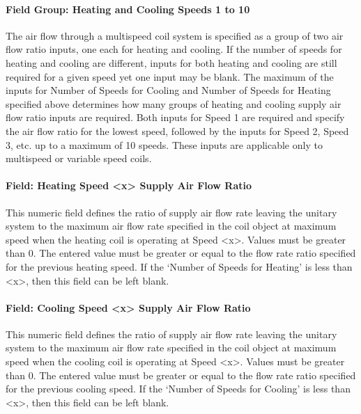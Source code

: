 \paragraph{Field Group: Heating and Cooling Speeds 1 to 10}\label{field-group-heating-and-cooling-speeds-1-to-10}

The air flow through a multispeed coil system is specified as a group of two air flow ratio inputs, one each for heating and cooling. If the number of speeds for heating and cooling are different, inputs for both heating and cooling are still required for a given speed yet one input may be blank. The maximum of the inputs for Number of Speeds for Cooling and Number of Speeds for Heating specified above determines how many groups of heating and cooling supply air flow ratio inputs are required. Both inputs for Speed 1 are required and specify the air flow ratio for the lowest speed, followed by the inputs for Speed 2, Speed 3, etc. up to a maximum of 10 speeds. These inputs are applicable only to multispeed or variable speed coils.

\paragraph{Field: Heating Speed \textless{}x\textgreater{} Supply Air Flow Ratio}\label{field-heating-speed-x-supply-air-flow-ratio}

This numeric field defines the ratio of supply air flow rate leaving the unitary system to the maximum air flow rate specified in the coil object at maximum speed when the heating coil is operating at Speed \textless{}x\textgreater{}. Values must be greater than 0. The entered value must be greater or equal to the flow rate ratio specified for the previous heating speed. If the `Number of Speeds for Heating' is less than \textless{}x\textgreater{}, then this field can be left blank.

\paragraph{Field: Cooling Speed \textless{}x\textgreater{} Supply Air Flow Ratio}\label{field-cooling-speed-x-supply-
air-flow-ratio}

This numeric field defines the ratio of supply air flow rate leaving the unitary system to the maximum air flow rate specified in the coil object at maximum speed when the cooling coil is operating at Speed \textless{}x\textgreater{}. Values must be greater than 0. The entered value must be greater or equal to the flow rate ratio specified for the previous cooling speed. If the `Number of Speeds for Cooling' is less than \textless{}x\textgreater{}, then this field can be left blank.

